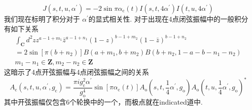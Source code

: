 \begin{equation}
	J\left(s, t, u, \alpha^{\prime}\right)=-2 \sin \pi \alpha_{\mathrm{c}}(t) I\left(s, t, 4 \alpha^{\prime}\right) I\left(t, u, 4 \alpha^{\prime}\right)
\end{equation}
我们现在标明了积分对于 $\alpha^{\prime} $的显式相关性.  对于出现在4点闭弦振幅中的一般积分有如下关系
\begin{equation}
	\begin{gathered}
		\int_{\mathbf{C}} d^{2} z z^{a-1+m_{1}} \bar{z}^{a-1+n_{1}}(1-z)^{b-1+m_{2}}(1-\bar{z})^{b-1+n_{2}} \\
		=2 \sin \left[\pi\left(b+n_{2}\right)\right] B\left(a+m_{1}, b+m_{2}\right) B\left(b+n_{2}, 1-a-b-n_{1}-n_{2}\right) \\
		m_{1}-n_{1} \in \mathbf{Z}, m_{2}-n_{2} \in \mathbf{Z}
	\end{gathered}
\end{equation}
这暗示了4点开弦振幅与4点闭弦振幅之间的关系
\begin{equation}
	A_{\mathrm{c}}\left(s, t, u, \alpha^{\prime}, g_{\mathrm{c}}\right)=\frac{\pi i g_{\mathrm{c}}^{2} \alpha^{\prime}}{g_{\mathrm{o}}^{4}} \sin \left[\pi \alpha_{\mathrm{c}}(t)\right] A_{\mathrm{o}}\left(s, t, \frac{1}{4} \alpha^{\prime}, g_{\mathrm{o}}\right) A_{\mathrm{o}}\left(t, u, \frac{1}{4} \alpha^{\prime}, g_{\mathrm{o}}\right)^{*}
\end{equation}
其中开弦振幅仅包含6个轮换中的一个，而极点就在indicated道中.\\

